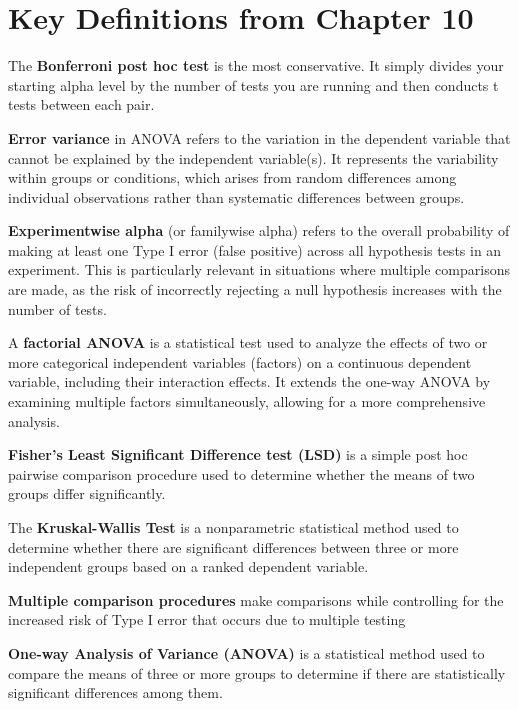 \documentclass[
  letterpaper,
  DIV=11,
  numbers=noendperiod]{scrreprt}
\begin{document}
\section*{Key Definitions from Chapter
10}\label{key-definitions-from-chapter-10}


The \textbf{Bonferroni post hoc test} is the most conservative. It
simply divides your starting alpha level by the number of tests you are
running and then conducts t tests between each pair.

\textbf{Error variance} in ANOVA refers to the variation in the
dependent variable that cannot be explained by the independent
variable(s). It represents the variability within groups or conditions,
which arises from random differences among individual observations
rather than systematic differences between groups.

\textbf{Experimentwise alpha} (or familywise alpha) refers to the
overall probability of making at least one Type I error (false positive)
across all hypothesis tests in an experiment. This is particularly
relevant in situations where multiple comparisons are made, as the risk
of incorrectly rejecting a null hypothesis increases with the number of
tests.

A \textbf{factorial ANOVA} is a statistical test used to analyze the
effects of two or more categorical independent variables (factors) on a
continuous dependent variable, including their interaction effects. It
extends the one-way ANOVA by examining multiple factors simultaneously,
allowing for a more comprehensive analysis.

\textbf{Fisher's Least Significant Difference test (LSD)} is a simple
post hoc pairwise comparison procedure used to determine whether the
means of two groups differ significantly.

The \textbf{Kruskal-Wallis Test} is a nonparametric statistical method
used to determine whether there are significant differences between
three or more independent groups based on a ranked dependent variable.

\textbf{Multiple comparison procedures} make comparisons while
controlling for the increased risk of Type I error that occurs due to
multiple testing

\textbf{One-way Analysis of Variance (ANOVA)} is a statistical method
used to compare the means of three or more groups to determine if there
are statistically significant differences among them.
\end{document}
